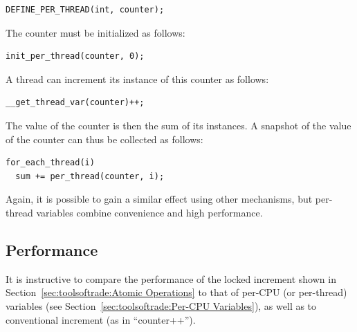 \vspace{5pt}
\begin{minipage}[t]{\columnwidth}
\small
\begin{verbatim}
DEFINE_PER_THREAD(int, counter);
\end{verbatim}
\end{minipage}
\vspace{5pt}

The counter must be initialized as follows:

\vspace{5pt}
\begin{minipage}[t]{\columnwidth}
\small
\begin{verbatim}
init_per_thread(counter, 0);
\end{verbatim}
\end{minipage}
\vspace{5pt}

A thread can increment its instance of this counter as follows:

\vspace{5pt}
\begin{minipage}[t]{\columnwidth}
\small
\begin{verbatim}
__get_thread_var(counter)++;
\end{verbatim}
\end{minipage}
\vspace{5pt}

The value of the counter is then the sum of its instances.
A snapshot of the value of the counter can thus be collected
as follows:

\vspace{5pt}
\begin{minipage}[t]{\columnwidth}
\small
\begin{verbatim}
for_each_thread(i)
  sum += per_thread(counter, i);
\end{verbatim}
\end{minipage}
\vspace{5pt}

Again, it is possible to gain a similar effect using other mechanisms,
but per-thread variables combine convenience and high performance.

\subsection{Performance}
\label{sec:toolsoftrade:Performance}

It is instructive to compare the performance of the locked increment
shown in
Section~\ref{sec:toolsoftrade:Atomic Operations}
to that of per-CPU (or per-thread) variables
(see Section~\ref{sec:toolsoftrade:Per-CPU Variables}),
as well as to conventional increment (as in ``counter++'').


